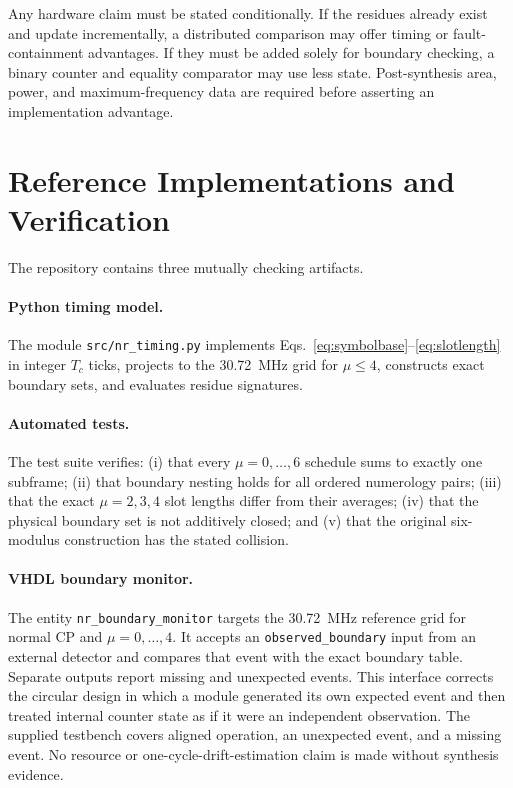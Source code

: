 \documentclass[11pt]{article}
\begin{document}
Any hardware claim must be stated conditionally.  If the residues already exist and update incrementally, a distributed comparison may offer timing or fault-containment advantages.  If they must be added solely for boundary checking, a binary counter and equality comparator may use less state.  Post-synthesis area, power, and maximum-frequency data are required before asserting an implementation advantage.

\section{Reference Implementations and Verification}

The repository contains three mutually checking artifacts.

\paragraph{Python timing model.}
The module \texttt{src/nr\_timing.py} implements Eqs.~\eqref{eq:symbolbase}--\eqref{eq:slotlength} in integer $T_c$ ticks, projects to the 30.72~MHz grid for $\mu\leq4$, constructs exact boundary sets, and evaluates residue signatures.

\paragraph{Automated tests.}
The test suite verifies: (i) that every $\mu=0,\ldots,6$ schedule sums to exactly one subframe; (ii) that boundary nesting holds for all ordered numerology pairs; (iii) that the exact $\mu=2,3,4$ slot lengths differ from their averages; (iv) that the physical boundary set is not additively closed; and (v) that the original six-modulus construction has the stated collision.

\paragraph{VHDL boundary monitor.}
The entity \texttt{nr\_boundary\_monitor} targets the 30.72~MHz reference grid for normal CP and $\mu=0,\ldots,4$.  It accepts an \texttt{observed\_boundary} input from an external detector and compares that event with the exact boundary table.  Separate outputs report missing and unexpected events.  This interface corrects the circular design in which a module generated its own expected event and then treated internal counter state as if it were an independent observation.  The supplied testbench covers aligned operation, an unexpected event, and a missing event.  No resource or one-cycle-drift-estimation claim is made without synthesis evidence.
\end{document}
